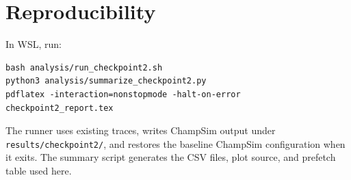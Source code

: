 \documentclass[11pt]{article}
\begin{document}
\section{Reproducibility}
In WSL, run:
\begin{verbatim}
bash analysis/run_checkpoint2.sh
python3 analysis/summarize_checkpoint2.py
pdflatex -interaction=nonstopmode -halt-on-error checkpoint2_report.tex
\end{verbatim}
The runner uses existing traces, writes ChampSim output under
\texttt{results/checkpoint2/}, and restores the baseline ChampSim configuration
when it exits. The summary script generates the CSV files, plot source, and
prefetch table used here.
\end{document}
